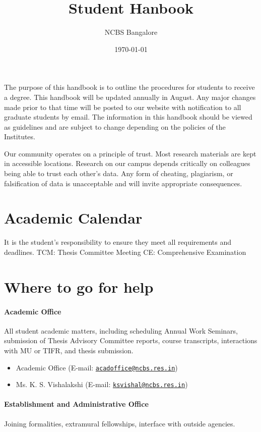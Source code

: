 \documentclass[a4paper,10pt]{article}
\author{NCBS Bangalore}
\title{Student Hanbook}
\date{\today}
\newcommand\MAILTO[2]{#1 (E-mail: \href{mailto:#2}{\nolinkurl{#2}})}
\begin{document}
The purpose of this handbook is to outline the procedures for students to receive a degree.
This handbook will be updated annually in August. Any major changes made prior to that
time will be posted to our website with notification to all graduate students by email. The
information in this handbook should be viewed as guidelines and are subject to change
depending on the policies of the Institutes.

\vspace{10cm}

\begin{mdframed}[frametitle=\textsc{Honor Code},backgroundcolor=yellow!20]
Our community operates on a principle of trust. Most research materials are kept
in accessible locations. Research on our campus depends critically on colleagues
being able to trust each other’s data.  Any form of cheating, plagiarism, or
falsification of data is unacceptable and will invite appropriate consequences.
\end{mdframed}


\newpage
\section*{Academic Calendar}

It is the student’s responsibility to ensure they meet all requirements and
deadlines.  TCM: Thesis Committee Meeting CE: Comprehensive Examination

\newpage
\section*{Where to go for help}

\paragraph{Academic Office} All student academic matters, including scheduling
Annual Work Seminars, submission of Thesis Advisory Committee reports, course
transcripts, interactions with MU or TIFR, and thesis submission.

\begin{itemize}
    \item \MAILTO{Academic Office}{acadoffice@ncbs.res.in} 
    \item \MAILTO{Ms. K. S. Vishalakshi}{ksvishal@ncbs.res.in}
\end{itemize}

\paragraph{Establishment and Administrative Office}
Joining formalities, extramural fellowships, interface with outside agencies.
\end{document}
